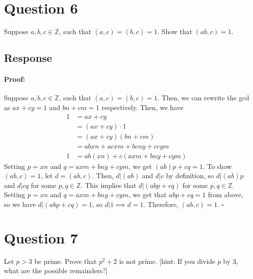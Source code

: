 \documentclass [12pt] {article}
\newcommand{\Z}{\mathbb{Z}}
\newenvironment{proof}{\paragraph{Proof:}}{\hfill$\square$}
\begin{document}
\section*{Question 6}
Suppose $a,b,c\in\Z$, such that $(a,c)=(b,c)=1$. Show that $(ab,c)=1$. 

\subsection*{Response}
\begin{proof}
    Suppose $a, b, c \in \Z$, such that $(a, c) = (b, c) = 1$. Then, we can rewrite the gcd as
    $ax + cy = 1$ and $bn + cm = 1$ respectively. Then, we have
    \begin{align*}
        1 &= ax + cy  \\
          &= (ax + cy) \cdot 1  \\
          &= (ax + cy)(bn + cm) \\
          &= abxn + acxm + bcny + ccym \\
        1 &= ab(xn) + c(axm + bny + cym)
    \end{align*}
    Setting $p = xn$ and $q = axm + bny + cym$, we get $(ab)p + cq = 1$. To show $(ab, c) = 1$,
    let $d = (ab, c)$. Then, $d | (ab)$ and $d | c$ by definition, so $d | (ab)p$ and $d | cq$ for 
    some $p, q \in \Z$. This implies that $d | (abp + cq)$ for some $p, q \in \Z$. Setting
    $p = xn$ and $q = axm + bny + cym$, we get that $abp + cq = 1$ from above, 
    so we have $d | (abp + cq) = 1$, so $d | 1 \implies d = 1$. Therefore, $(ab, c) = 1$.
\end{proof}
\newpage


\section*{Question 7}
Let $p>3$ be prime. Prove that $p^2+2$ is not prime. [hint: If you divide $p$ by $3$, what are the possible remainders?]
\end{document}
